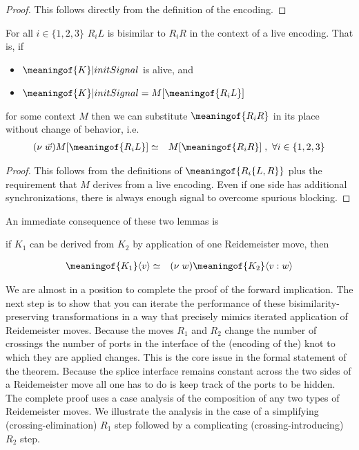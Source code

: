 \begin{proof}
  This follows directly from the definition of the encoding.
\end{proof}

\begin{lemma}[substitution]
  For all $i \in \{ 1, 2, 3 \}$ $R_{i}L$ is bisimilar to $R_{i}R$ in the
  context of a live encoding. That is, if
  \begin{itemize}
    \item $\meaningof{K} | initSignal$ is alive, and
    \item $\meaningof{K} | initSignal = M[ \meaningof{R_{i}L} ]$
  \end{itemize}
for some context $M$ then we can substitute $\meaningof{R_{i}R}$ in
  its place without change of behavior, i.e.
  \begin{eqnarray}
    (\nu \; \vec{w})M[ \meaningof{R_{i}L} ] & \simeq & M[ \meaningof{R_{i}R} ] \; ,\ \forall i \in \{ 1, 2, 3 \} \nonumber
  \end{eqnarray}
\end{lemma}

\begin{proof}
  This follows from the definitions of $\meaningof{R_{i}\{L,R\}}$ plus
  the requirement that $M$ derives from a live encoding. Even if one
  side has additional synchronizations, there is always enough signal
  to overcome spurious blocking.
\end{proof}

An immediate consequence of these two lemmas is 

\begin{lemma}[1-step]
  if $K_{1}$ can be derived from $K_{2}$ by application of one Reidemeister move, then 

  \begin{eqnarray}
    \meaningof{K_{1}}\langle v \rangle & \simeq & (\nu \; w)\meaningof{K_{2}}\langle v:w \rangle \nonumber
  \end{eqnarray}
\end{lemma}

We are almost in a position to complete the proof of the forward
implication. The next step is to show that you can iterate the
performance of these bisimilarity-preserving transformations in a way
that precisely mimics iterated application of Reidemeister
moves. Because the moves $R_{1}$ and $R_{2}$ change the number of
crossings the number of ports in the interface of the (encoding of
the) knot to which they are applied changes. This is the core issue in
the formal statement of the theorem. Because the splice interface
remains constant across the two sides of a Reidemeister move all one
has to do is keep track of the ports to be hidden. The complete proof
uses a case analysis of the composition of any two types of
Reidemeister moves. We illustrate the analysis in the case of a
simplifying (crossing-elimination) $R_1$ step followed by a complicating
(crossing-introducing) $R_2$ step.

